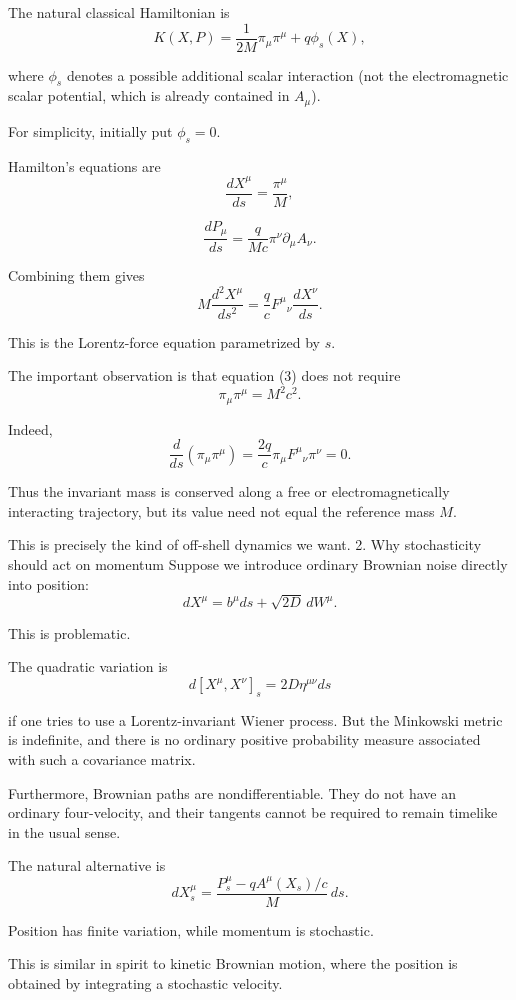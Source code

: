 The natural classical Hamiltonian is
\[
K(X,P)=\frac{1}{2M}\pi_\mu\pi^\mu+q\phi_s(X),
\]

where \(\phi_s\) denotes a possible additional scalar interaction (not the electromagnetic scalar potential, which is already contained in \(A_\mu\)).

For simplicity, initially put \(\phi_s=0\).

Hamilton's equations are
\[
\frac{dX^\mu}{ds}=\frac{\pi^\mu}{M},
\tag{1}
\]

\[
\frac{dP_\mu}{ds}
=
\frac q{Mc}\pi^\nu\partial_\mu A_\nu.
\tag{2}
\]

Combining them gives
\[
\boxed{
M\frac{d^2X^\mu}{ds^2}
=
\frac qc F^\mu{}_\nu
\frac{dX^\nu}{ds}.
}
\tag{3}
\]

This is the Lorentz-force equation parametrized by \(s\).

The important observation is that equation (3) does not require
\[
\pi_\mu\pi^\mu=M^2c^2.
\]

Indeed,
\[
\frac{d}{ds}(\pi_\mu\pi^\mu)
=
\frac{2q}{c}\pi_\mu F^\mu{}_\nu\pi^\nu=0.
\tag{4}
\]

Thus the invariant mass is conserved along a free or electromagnetically interacting trajectory, but its value need not equal the reference mass \(M\).

This is precisely the kind of off-shell dynamics we want.
2. Why stochasticity should act on momentum
Suppose we introduce ordinary Brownian noise directly into position:
\[
dX^\mu=b^\mu ds+\sqrt{2D}\,dW^\mu.
\]

This is problematic.

The quadratic variation is
\[
d[X^\mu,X^\nu]_s
=
2D\eta^{\mu\nu}ds
\]

if one tries to use a Lorentz-invariant Wiener process. But the Minkowski metric is indefinite, and there is no ordinary positive probability measure associated with such a covariance matrix.

Furthermore, Brownian paths are nondifferentiable. They do not have an ordinary four-velocity, and their tangents cannot be required to remain timelike in the usual sense.

The natural alternative is
\[
\boxed{
dX^\mu_s=\frac{P^\mu_s-qA^\mu(X_s)/c}{M}\,ds.
}
\tag{5}
\]

Position has finite variation, while momentum is stochastic.

This is similar in spirit to kinetic Brownian motion, where the position is obtained by integrating a stochastic velocity.

